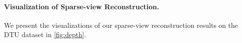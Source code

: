 \paragraph{Visualization of Sparse-view Reconstruction.} We present the visualizations of our sparse-view reconstruction results on the DTU dataset in \cref{fig:depth}. 







% 


% 

% 
% 


